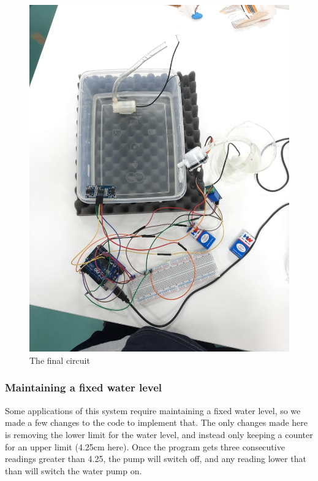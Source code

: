 \documentclass[12pt]{article}
\begin{document}
\begin{figure}[h!]
    \centering
    \includegraphics[scale=0.17, angle=90]{final circuit.jpg}
    \caption{The final circuit}
    \label{fig:my_label}
\end{figure}
\subsubsection*{Maintaining a fixed water level}

Some applications of this system require maintaining a fixed water level, so we made a few changes to the code to implement that. The only changes made here is removing the lower limit for the water level, and instead only keeping a counter for an upper limit (4.25cm here). Once the program gets three consecutive readings greater than 4.25, the pump will switch off, and any reading lower that than will switch the water pump on.
\end{document}

